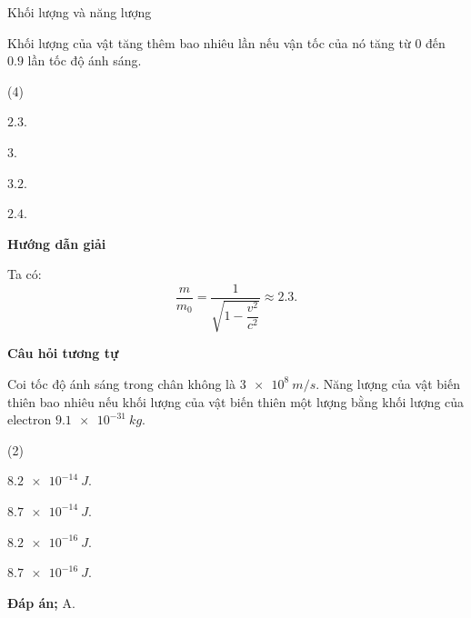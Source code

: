 \begin{dang}{Khối lượng và năng lượng}
	{
		Khối lượng của vật tăng thêm bao nhiêu lần nếu vận tốc của nó tăng từ $ 0 $ đến $ \num{0,9} $ lần tốc độ ánh sáng.
		\begin{mcq}(4)
			\item $ \num{2,3} $.
			\item $ \num{3} $.
			\item $ \num{3,2} $.
			\item $ \num{2,4} $.
		\end{mcq}
	}
	{
		\begin{center}
			\textbf{Hướng dẫn giải}
		\end{center}
		Ta có:
		$$
		\dfrac{m}{m_{0}} = \dfrac{1}{\sqrt{1-\dfrac{v^{2}}{c^{2}}}} \approx \num{2,3}.
		$$
		\begin{center}
			\textbf{Câu hỏi tương tự}
		\end{center}
		Coi tốc độ ánh sáng trong chân không là $ \SI{3 e8}{m/s} $. Năng lượng của vật biến thiên bao nhiêu nếu khối lượng của vật biến thiên một lượng bằng khối lượng của electron $ \SI{9,1 e-31}{kg} $.
		\begin{mcq}(2)
			\item $ \SI{8,2 e-14}{J} $.
			\item $ \SI{8,7 e-14}{J} $.
			\item $ \SI{8,2 e-16}{J} $.
			\item $ \SI{8,7 e-16}{J} $.
		\end{mcq}
		\textbf{Đáp án;} A.
	}
	
\end{dang}

